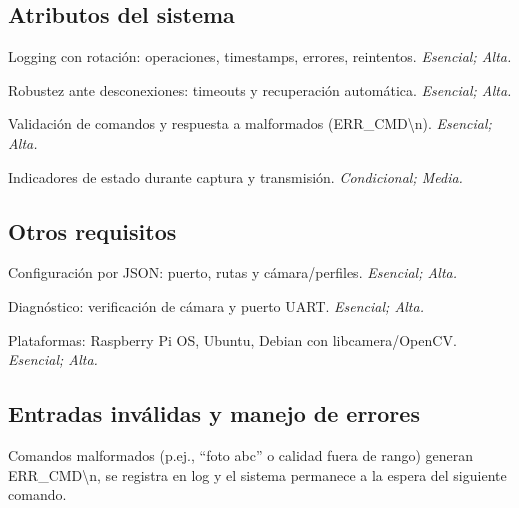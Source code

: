 \documentclass[11pt,codirector]{charter}
\makeatletter
\newcommand{\mytwodigits}[1]{\two@digits{#1}}
\newcounter{reqCounter}
\def\texttt#1{#1}%
\makeatother
\begin{document}
	\subsection{Atributos del sistema}
	\begin{description}[leftmargin=1.8cm,style=nextline]
		\item[\textbf{[\CODrequerimiento\mytwodigits{\value{reqCounter}}]}]
		Logging con rotación: operaciones, timestamps, errores, reintentos. \emph{Esencial; Alta.}
		
		\item[\textbf{[\CODrequerimiento\mytwodigits{\value{reqCounter}}]}]
		Robustez ante desconexiones: timeouts y recuperación automática. \emph{Esencial; Alta.}
		
		\item[\textbf{[\CODrequerimiento\mytwodigits{\value{reqCounter}}]}]
		Validación de comandos y respuesta a malformados (\texttt{ERR\_CMD\textbackslash n}). \emph{Esencial; Alta.}
		
		\item[\textbf{[\CODrequerimiento\mytwodigits{\value{reqCounter}}]}]
		Indicadores de estado durante captura y transmisión. \emph{Condicional; Media.}
	\end{description}
	
	\subsection{Otros requisitos}
	\begin{description}[leftmargin=1.8cm,style=nextline]
		\item[\textbf{[\CODrequerimiento\mytwodigits{\value{reqCounter}}]}]
		Configuración por JSON: puerto, rutas y cámara/perfiles. \emph{Esencial; Alta.}
		
		\item[\textbf{[\CODrequerimiento\mytwodigits{\value{reqCounter}}]}]
		Diagnóstico: verificación de cámara y puerto UART. \emph{Esencial; Alta.}
		
		\item[\textbf{[\CODrequerimiento\mytwodigits{\value{reqCounter}}]}]
		Plataformas: Raspberry Pi OS, Ubuntu, Debian con libcamera/OpenCV. \emph{Esencial; Alta.}
	\end{description}
	
	\subsection{Entradas inválidas y manejo de errores}
	Comandos malformados (p.ej., ``\texttt{foto abc}'' o calidad fuera de rango) generan \texttt{ERR\_CMD\textbackslash n}, se registra en log y el sistema permanece a la espera del siguiente comando.
	
\end{document}
